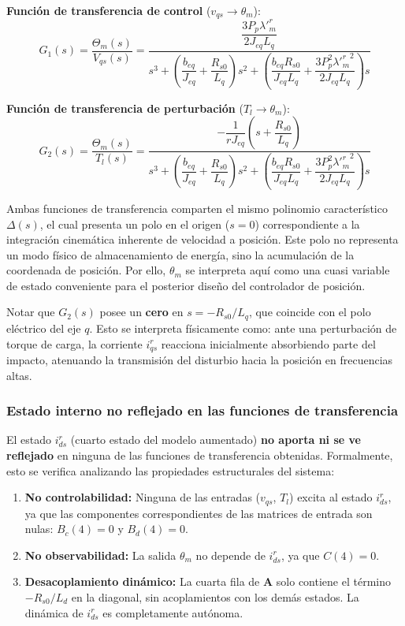 \documentclass[12pt, a4paper,journal, onecolumn, compsoc]{IEEEtran}
\begin{document}
\vspace{0.3cm}
\textbf{Función de transferencia de control} ($v_{qs} \to \theta_m$):
\begin{equation} \label{eq:tf_vqs}
\boxed{
    G_1(s) = \frac{\Theta_m(s)}{V_{qs}(s)} = \frac{\dfrac{3 P_p \lambda'^r_m}{2 J_{eq} L_q}}{s^3 + \left(\dfrac{b_{eq}}{J_{eq}} + \dfrac{R_{s0}}{L_q}\right)s^2 + \left(\dfrac{b_{eq} R_{s0}}{J_{eq} L_q} + \dfrac{3 P_p^2 {\lambda'^r_m}^2}{2 J_{eq} L_q}\right)s}
}
\end{equation}

\vspace{0.3cm}
\textbf{Función de transferencia de perturbación} ($T_l \to \theta_m$):
\begin{equation} \label{eq:tf_Tl}
\boxed{
    G_2(s) = \frac{\Theta_m(s)}{T_l(s)} = \frac{-\dfrac{1}{r J_{eq}}\left(s + \dfrac{R_{s0}}{L_q}\right)}{s^3 + \left(\dfrac{b_{eq}}{J_{eq}} + \dfrac{R_{s0}}{L_q}\right)s^2 + \left(\dfrac{b_{eq} R_{s0}}{J_{eq} L_q} + \dfrac{3 P_p^2 {\lambda'^r_m}^2}{2 J_{eq} L_q}\right)s}
}
\end{equation}

Ambas funciones de transferencia comparten el mismo polinomio característico $\Delta(s)$, el cual presenta un polo en el origen ($s=0$) correspondiente a la integración cinemática inherente de velocidad a posición. Este polo no representa un modo físico de almacenamiento de energía, sino la acumulación de la coordenada de posición. Por ello, $\theta_m$ se interpreta aquí como una cuasi variable de estado conveniente para el posterior diseño del controlador de posición.

Notar que $G_2(s)$ posee un \textbf{cero} en $s = -R_{s0}/L_q$, que coincide con el polo eléctrico del eje $q$. Esto se interpreta físicamente como: ante una perturbación de torque de carga, la corriente $i_{qs}^r$ reacciona inicialmente absorbiendo parte del impacto, atenuando la transmisión del disturbio hacia la posición en frecuencias altas.

\subsubsection{Estado interno no reflejado en las funciones de transferencia}
El estado $i_{ds}^r$ (cuarto estado del modelo aumentado) \textbf{no aporta ni se ve reflejado} en ninguna de las funciones de transferencia obtenidas. Formalmente, esto se verifica analizando las propiedades estructurales del sistema:

\begin{enumerate}
    \item \textbf{No controlabilidad:} Ninguna de las entradas ($v_{qs}$, $T_l$) excita al estado $i_{ds}^r$, ya que las componentes correspondientes de las matrices de entrada son nulas: $B_c(4) = 0$ y $B_d(4) = 0$.
    \item \textbf{No observabilidad:} La salida $\theta_m$ no depende de $i_{ds}^r$, ya que $C(4) = 0$.
    \item \textbf{Desacoplamiento dinámico:} La cuarta fila de $\mathbf{A}$ solo contiene el término $-R_{s0}/L_d$ en la diagonal, sin acoplamientos con los demás estados. La dinámica de $i_{ds}^r$ es completamente autónoma.
\end{enumerate}
\end{document}

